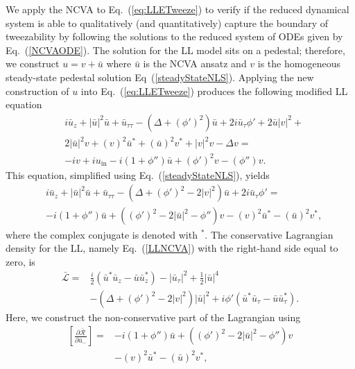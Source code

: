\documentclass[aps,floatfix,showpacs,preprintnumbers,twocolumn,nofootinbib]{revtex4}
\begin{document}
We apply the NCVA to Eq.~(\ref{eq:LLETweeze}) to verify if the reduced dynamical system is able to qualitatively (and quantitatively) capture the boundary of tweezability by following the solutions to the reduced system of ODEs given by Eq.~(\ref{NCVAODE}).
The solution for the LL model sits on a pedestal; therefore, we construct $u = v + \bar{u}$ where $\bar{u}$ is the NCVA ansatz and $v$ is the homogeneous steady-state pedestal solution Eq~(\ref{steadyStateNLS}).  Applying the new construction of $u$ into Eq.~(\ref{eq:LLETweeze}) produces the following modified LL equation
\begin{align}
&i \bar{u}_z + |\bar{u}|^2 \bar{u} + \bar{u}_{\tau\tau} - (\Delta + (\phi')^2) \bar{u} + 2i \bar{u}_{\tau} \phi' +  2\bar{u} |v|^2 + \nonumber \\
&2 |\bar{u}|^2 v + (v)^2 \bar{u}^* + (\bar{u})^2 v^* + |v|^2 v - \Delta v = \nonumber \\
 &- i v + i u_{\mathrm{in}} - i (1+\phi'') \bar{u} + (\phi')^2 v - (\phi'')v.
\end{align}
This equation, simplified using Eq.~(\ref{steadyStateNLS}), yields
\begin{align}
&i \bar{u}_z + |\bar{u}|^2 \bar{u} + \bar{u}_{\tau\tau}  - (\Delta + (\phi')^2 -2|v|^2) \bar{u} + 2i \bar{u}_{\tau} \phi' =  \nonumber \\
 &- i (1+\phi'') \bar{u} + \left((\phi')^2  - 2 |\bar{u}|^2- \phi''\right) v -  (v)^2 \bar{u}^* - (\bar{u})^2 v^*,
 \label{LLNCVA}
\end{align}
where the complex conjugate is denoted with $^*$.  The conservative Lagrangian density for the LL, namely Eq.~(\ref{LLNCVA}) with the right-hand side equal to zero, is
\begin{align}
\bar{\mathcal{L}} =& \frac{i}{2} \left(\bar{u}^* \bar{u}_z - \bar{u}\bar{u}_z^* \right) - |\bar{u}_{\tau}|^2 + \frac{1}{2} |\bar{u}|^4 \nonumber \\
&-\left( \Delta +  (\phi')^2 -2|v|^2 \right) |\bar{u}|^2 + i\phi' \left(\bar{u}^* \bar{u}_{\tau} - \bar{u}\bar{u}_{\tau}^*  \right).
\label{tweezeDensity} 
\end{align}
Here, we construct the non-conservative part of the Lagrangian using 
\begin{align}
\left [ \frac{\partial \bar{\mathcal{R}}}{\partial \bar{u}_-} \right ] =&- i (1+\phi'') \bar{u} + \left((\phi')^2  - 2 |\bar{u}|^2- \phi''\right) v \nonumber \\
&-  (v)^2 \bar{u}^* - (\bar{u})^2 v^*,
\end{align}
\end{document}
